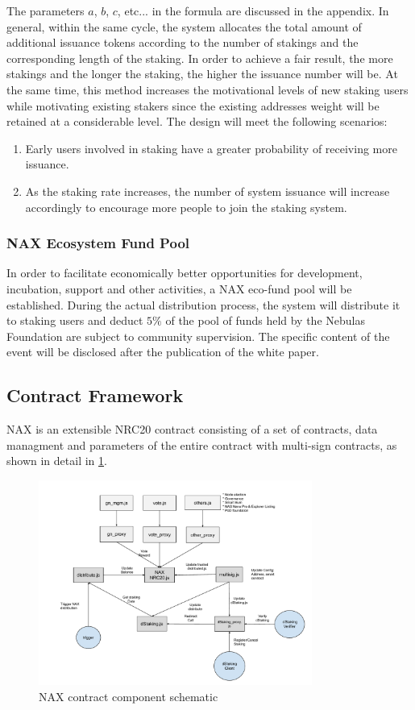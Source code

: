 The parameters $a$, $b$, $c$, etc... in the formula are discussed in the appendix. In general, within the same cycle, the system allocates the total amount of additional issuance tokens according to the number of stakings and the corresponding length of the staking. In order to achieve a fair result, the more stakings and the longer the staking, the higher the issuance number will be. At the same time, this method increases the motivational levels of new staking users while motivating existing stakers since the existing addresses weight will be retained at a considerable level. The design will meet the following scenarios:

\begin{enumerate}[\hspace{1cm}(a)]
  \item Early users involved in staking have a greater probability of receiving more issuance.
  \item As the staking rate increases, the number of system issuance will increase accordingly to encourage more people to join the staking system.
\end{enumerate}

\subsubsection{NAX Ecosystem Fund Pool}
In order to facilitate economically better opportunities for development, incubation, support and other activities, a NAX eco-fund pool will be established. During the actual distribution process, the system will distribute it to staking users and deduct $5\%$ of the pool of funds held by the Nebulas Foundation are subject to community supervision. The specific content of the event will be disclosed after the publication of the white paper.

\subsection{Contract Framework}
NAX is an extensible NRC20 contract consisting of a set of contracts, data managment and parameters of the entire contract with multi-sign contracts, as shown in detail in \ref{fig:nax_framework}.

\begin{figure}[htbp]
  \centering
  \includegraphics[width=0.8\textwidth]{../common/nax.pdf}
  \caption{NAX contract component schematic \label{fig:nax_framework}}
\end{figure}
